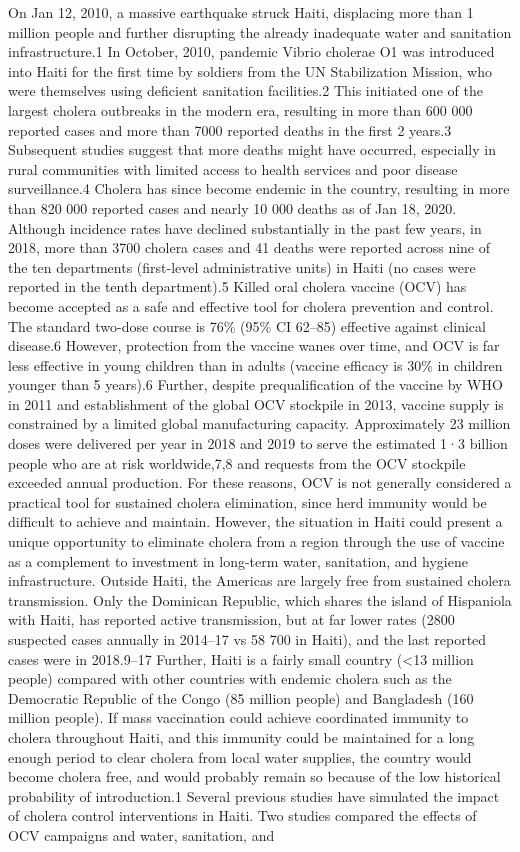  On Jan 12, 2010, a massive earthquake struck Haiti, displacing more than 1 million people and further disrupting the already inadequate water and sanitation infrastructure.1 In October, 2010, pandemic Vibrio cholerae O1 was introduced into Haiti for the first time by soldiers from the UN Stabilization Mission, who were themselves using deficient sanitation facilities.2 This initiated one of the largest cholera outbreaks in the modern era, resulting in more than 600 000 reported cases and more than 7000 reported deaths in the first 2 years.3 Subsequent studies suggest that more deaths might have occurred, especially in rural communities with limited access to health services and poor disease surveillance.4 Cholera has since become endemic in the country, resulting in more than 820 000 reported cases and nearly 10 000 deaths as of Jan 18, 2020. Although incidence rates have declined substantially in the past few years, in 2018, more than 3700 cholera cases and 41 deaths were reported across nine of the ten departments (first-level administrative units) in Haiti (no cases were reported in the tenth department).5 Killed oral cholera vaccine (OCV) has become accepted as a safe and effective tool for cholera prevention and control. The standard two-dose course is 76\% (95\% CI 62–85) effective against clinical disease.6 However, protection from the vaccine wanes over time, and OCV is far less effective in young children than in adults (vaccine efficacy is 30\% in children younger than 5 years).6 Further, despite prequalification of the vaccine by WHO in 2011 and establishment of the global OCV stockpile in 2013, vaccine supply is constrained by a limited global manufacturing capacity. Approximately 23 million doses were delivered per year in 2018 and 2019 to serve the estimated 1·3 billion people who are at risk worldwide,7,8 and requests from the OCV stockpile exceeded annual production. For these reasons, OCV is not generally considered a practical tool for sustained cholera elimination, since herd immunity would be difficult to achieve and maintain. However, the situation in Haiti could present a unique opportunity to eliminate cholera from a region through the use of vaccine as a complement to investment in long-term water, sanitation, and hygiene infrastructure. Outside Haiti, the Americas are largely free from sustained cholera transmission. Only the Dominican Republic, which shares the island of Hispaniola with Haiti, has reported active transmission, but at far lower rates (2800 suspected cases annually in 2014–17 vs 58 700 in Haiti), and the last reported cases were in 2018.9–17 Further, Haiti is a fairly small country (<13 million people) compared with other countries with endemic cholera such as the Democratic Republic of the Congo (85 million people) and Bangladesh (160 million people). If mass vaccination could achieve coordinated immunity to cholera throughout Haiti, and this immunity could be maintained for a long enough period to clear cholera from local water supplies, the country would become cholera free, and would probably remain so because of the low historical probability of introduction.1 Several previous studies have simulated the impact of cholera control interventions in Haiti. Two studies compared the effects of OCV campaigns and water, sanitation, and 